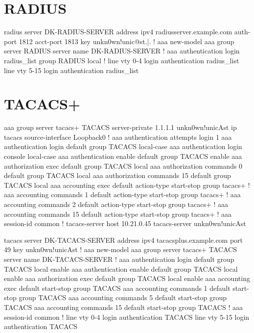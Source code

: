 \documentclass[a4paper,12pt,twoside,twocolumn,landscape]{book}
\begin{document}
\newpage

\section{RADIUS}


\begin{txt}
radius server DK-RADIUS-SERVER
 address ipv4 radiusserver.example.com auth-port 1812 acct-port 1813
 key unkn0wn!unic@st.|.
!
aaa new-model
aaa group server RADIUS
 server name DK-RADIUS-SERVER
!
aaa authentication login radius_list group RADIUS local
!
line vty 0-4
 login authentication radius_list
line vty 5-15
 login authentication radius_list
\end{txt}

\newpage

\section{TACACS+}


\begin{txt}
aaa group server tacacs+ TACACS
server-private 1.1.1.1 unkn0wn!unicAst
ip tacacs source-interface Loopback0
!
aaa authentication attempts login 1
aaa authentication login default group TACACS local-case
aaa authentication login console local-case
aaa authentication enable default group TACACS enable
aaa authorization exec default group TACACS local 
aaa authorization commands 0 default group TACACS local 
aaa authorization commands 15 default group TACACS local 
aaa accounting exec default
 action-type start-stop
 group tacacs+
!
aaa accounting commands 1 default
 action-type start-stop
 group tacacs+
!
aaa accounting commands 2 default
 action-type start-stop
 group tacacs+
!
aaa accounting commands 15 default
 action-type start-stop
 group tacacs+
!
aaa session-id common
!
tacacs-server host 10.21.0.45
tacacs-server unkn0wn!unicAst

\end{txt}

\begin{txt}
tacacs server DK-TACACS-SERVER
 address ipv4 tacacsplus.example.com
 port 49
 key unkn0wn!unicAst
!
aaa new-model
aaa group server tacacs+ TACACS
 server name DK-TACACS-SERVER
!
aaa authentication login default group TACACS local enable
aaa authentication enable default group TACACS local enable
aaa authorization exec default group TACACS local enable
aaa accounting exec default start-stop group TACACS
aaa accounting commands 1 default start-stop group TACACS
aaa accounting commands 5 default start-stop group TACACS
aaa accounting commands 15 default start-stop group TACACS
!
aaa session-id common
!
line vty 0-4
 login authentication TACACS
line vty 5-15
 login authentication TACACS
\end{txt}
\end{document}
